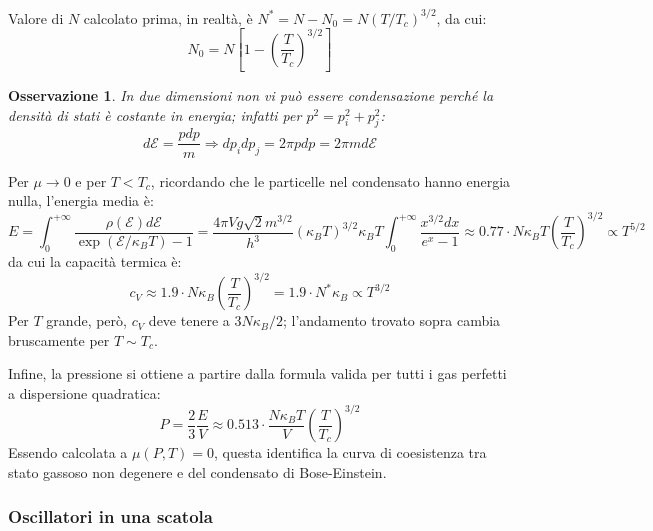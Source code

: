 \documentclass[10pt, a4paper]{scrartcl}
\numberwithin{equation}{subsection}
\theoremstyle{style1}
\newtheorem{osservazione}{Osservazione}[section]
\theoremstyle{style2}
\begin{document}
Valore di $N$ calcolato prima, in realt\`a, \`e $N^* = N - N_0 = N (T / T_c)^{3 / 2} $, da cui:
\begin{equation}
	N_0 = N \left[1 - \left(\frac{T}{T_c}\right) ^{3 / 2} \right] 
\end{equation}
\begin{osservazione}
	In due dimensioni non vi pu\`o essere condensazione perch\'e la densit\`a di stati \`e costante in energia; infatti per $p^2=p_i^2+p_j^2$:
	\[
	d \mathscr{E} = \frac{p dp }{m} \Rightarrow dp_i dp_j = 2 \pi p dp = 2\pi m d\mathscr{E}
	\] 
\end{osservazione}
\noindent Per $\mu \to 0$ e per $T< T_c$, ricordando che le particelle nel condensato hanno energia nulla, l'energia media \`e:
\begin{equation}
		E = \int_{0} ^{+\infty}\frac{\rho  ( \mathscr{E}) d \mathscr{E}}{\exp(\mathscr{E} / \kappa _B T) - 1} = \frac{4\pi V g \sqrt{2} m^{3 / 2} }{h^3} (\kappa _BT)^{ 3 / 2} \kappa _B T \int_{0} ^{+\infty} \frac{x ^{3 / 2} dx}{e^x - 1}\approx 0.77 \cdot N\kappa _B T \left(\frac{T}{T_c}\right) ^{3 / 2} \propto T^{5 / 2} 
\end{equation}
da cui la capacit\`a termica \`e:
\begin{equation}
	c_V \approx 1.9 \cdot  N\kappa _B \left(\frac{T}{T_c}\right) ^{3 / 2} = 1.9 \cdot  N^* \kappa _B \propto T^{3 / 2} 
\end{equation}
Per $T$ grande, per\`o, $c_V $ deve tenere a $3N\kappa _B / 2$; l'andamento trovato sopra cambia bruscamente per $T \sim T_c$.

Infine, la pressione si ottiene a partire dalla formula valida per tutti i gas perfetti a dispersione quadratica:
\begin{equation}
	P = \frac{2}{3} \frac{E}{V} \approx 0.513 \cdot  \frac{N\kappa _B T}{V} \left(\frac{T}{T_c}\right) ^{3/2} 
\end{equation}
Essendo calcolata a $\mu (P,T) = 0$, questa identifica la curva di coesistenza tra stato gassoso non degenere e del condensato di Bose-Einstein.

\subsubsection{Oscillatori in una scatola}
\end{document}
